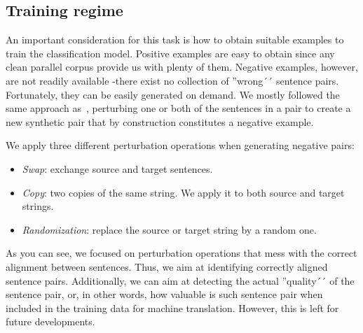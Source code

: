 \subsection{Training regime}
\label{ssec:training}

An important consideration for this task is how to obtain suitable examples to train the classification model. Positive examples are easy to obtain since any clean parallel corpus provide us with plenty of them. Negative examples, however, are not readily available -there exist no collection of ''wrong´´ sentence pairs. Fortunately, they can be easily generated on demand. We mostly followed the same approach as~\cite{Hainan17}, perturbing one or both of the sentences in a pair to create a new synthetic pair that by construction constitutes a negative example.

We apply three different perturbation operations when generating negative pairs:
\begin{itemize}
\item \textit{Swap}: exchange source and target sentences.
\item \textit{Copy}: two copies of the same string. We apply it to both source and target strings.
\item \textit{Randomization}: replace the source or target string by a random one.
\end{itemize}

As you can see, we focused on perturbation operations that mess with the correct alignment between sentences. Thus, we aim at identifying correctly aligned sentence pairs. Additionally, we can aim at detecting the actual ''quality´´ of the sentence pair, or, in other words, how valuable is such sentence pair when included in the training data for machine translation. However, this is left for future developments.

